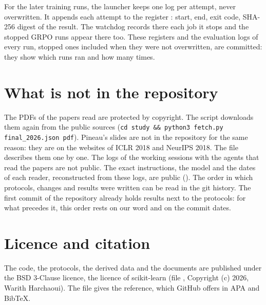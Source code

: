 For the later training runs, the launcher  keeps one log per attempt, never
overwritten. It appends each attempt to the register : start, end, exit
code, SHA-256 digest of the result. The watchdog records there each job it stops and the stopped
GRPO runs appear there too. These registers and the evaluation logs of every run, stopped ones
included when they were not overwritten, are committed: they show which runs ran and how many times.

\section{What is not in the repository}
\label{sec:absent}

The PDFs of the papers read are protected by copyright. The script  downloads
them again from the public sources (\texttt{cd study \&\& python3 fetch.py final\_2026.json pdf}).
Pineau's slides are not in the repository for the same reason: they are on the websites of ICLR 2018
and NeurIPS 2018. The file  describes them one by one. The logs of the working
sessions with the agents that read the papers are not public. The exact instructions, the model and
the dates of each reader, reconstructed from these logs, are public (). The order
in which protocols, changes and results were written can be read in the git history. The first
commit of the repository already holds results next to the protocols: for what precedes it, this
order rests on our word and on the commit dates.

\section{Licence and citation}
\label{sec:licence}

The code, the protocols, the derived data and the documents are published under the BSD 3-Clause
licence, the licence of scikit-learn (file , Copyright (c) 2026, Warith Harchaoui). The
file  gives the reference, which GitHub offers in APA and BibTeX.
